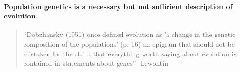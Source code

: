 \paragraph{Population genetics is a necessary but not sufficient description of evolution.}
\begin{quote}
``Dobzhansky (1951) once defined evolution as 'a change in the genetic
composition of the populations' (p. 16) an epigram that should not be
mistaken for the claim that everything worth saying about evolution is
contained in statements about genes'' -Lewontin \cite{lewontin01} 
\end{quote}

\newpage